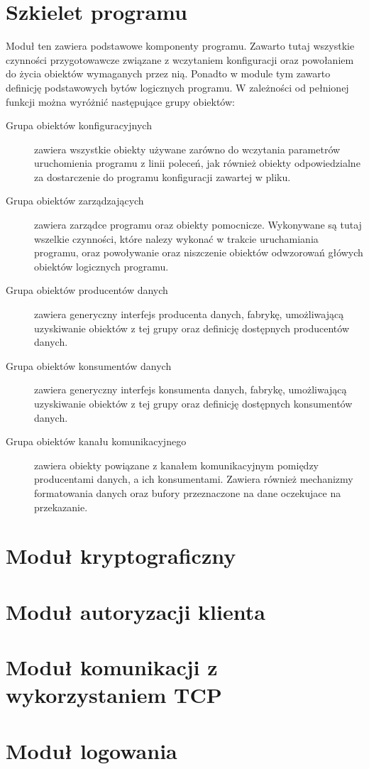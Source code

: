 \section[Szkielet programu][Szkielet programu]{Szkielet programu}
\label{sec:ModBase}

Moduł ten zawiera podstawowe komponenty programu. Zawarto tutaj
wszystkie czynności przygotowawcze związane z wczytaniem konfiguracji
oraz powołaniem do życia obiektów wymaganych przez nią. Ponadto w
module tym zawarto definicję podstawowych bytów logicznych programu. W
zależności od pełnionej funkcji można wyróżnić następujące grupy obiektów:

\begin{description}
\item[Grupa obiektów konfiguracyjnych] zawiera wszystkie obiekty
  używane zarówno do wczytania parametrów uruchomienia programu z
  linii poleceń, jak również obiekty odpowiedzialne za dostarczenie do
  programu konfiguracji zawartej w pliku.
\item[Grupa obiektów zarządzających] zawiera zarządce programu oraz
  obiekty pomocnicze. Wykonywane są tutaj wszelkie czynności, które
  nalezy wykonać w trakcie uruchamiania programu, oraz powoływanie
  oraz niszczenie obiektów odwzorowań główych obiektów logicznych
  programu.
\item[Grupa obiektów producentów danych] zawiera generyczny interfejs
  producenta danych, fabrykę, umożliwającą uzyskiwanie obiektów z tej
  grupy oraz definicję dostępnych producentów danych.
\item[Grupa obiektów konsumentów danych] zawiera generyczny interfejs
  konsumenta danych, fabrykę, umożliwającą uzyskiwanie obiektów z tej
  grupy oraz definicję dostępnych konsumentów danych.
\item[Grupa obiektów kanału komunikacyjnego] zawiera obiekty powiązane
  z kanałem komunikacyjnym pomiędzy producentami danych, a ich
  konsumentami. Zawiera również mechanizmy formatowania danych oraz
  bufory przeznaczone na dane oczekujace na przekazanie.
\end{description}

\section[Moduł kryptograficzny][Moduł kryptograficzny]{Moduł kryptograficzny}
\label{sec:ModCrypto}

\section[Moduł autoryzacyjny][Moduł autoryzacji klienta]{Moduł autoryzacji klienta}
\label{sec:ModAuth}

\section[Moduł TCP][Moduł komunikacji z wykorzystaniem TCP]{Moduł komunikacji z wykorzystaniem TCP}

\section[Moduł logowania][Moduł logowania]{Moduł logowania}
